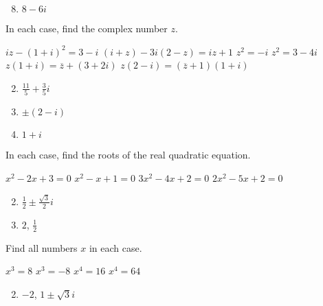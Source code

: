 \begin{multicols}{2}
\begin{ex}
\begin{sol}
\begin{enumerate}[label={\alph*.}]
\setcounter{enumi}{7}
\item  $8 - 6i$

\end{enumerate}
\end{sol}
\end{ex}

\begin{ex}
In each case, find the complex number $z$.

\begin{exenumerate}
\exitem $ iz - (1 + i)^{2} = 3 - i$
\exitem* $(i + z) - 3i(2 - z) = iz + 1$
\exitem $z^{2} = -i$
\exitem $z^{2} = 3 - 4i$
\exitem $z(1+i) = \overline{z} + (3+2i)$
\exitem* $z(2-i) = (\overline{z}+1)(1+i)$
\end{exenumerate}
\begin{sol}
\begin{enumerate}[label={\alph*.}]
\setcounter{enumi}{1}
\item $\frac{11}{5} + \frac{3}{5}i$


\setcounter{enumi}{3}
\item  $\pm(2 - i)$

\setcounter{enumi}{5}
\item $ 1 + i$

\end{enumerate}
\end{sol}
\end{ex}

\begin{ex}
In each case, find the roots of the real quadratic equation.

\begin{exenumerate}
\exitem  $x^{2} - 2x + 3 = 0$
\exitem  $x^{2} - x + 1 = 0$
\exitem $3x^{2} - 4x + 2 = 0$
\exitem  $2x^{2} - 5x + 2 = 0$
\end{exenumerate}
\begin{sol}
\begin{enumerate}[label={\alph*.}]
\setcounter{enumi}{1}
\item $\frac{1}{2} \pm \frac{\sqrt{3}}{2}i$


\setcounter{enumi}{3}
\item  $2$, $\frac{1}{2}$

\end{enumerate}
\end{sol}
\end{ex}

\begin{ex}
Find all numbers $x$ in each case.

\begin{exenumerate}
\exitem $x^{3} = 8$
\exitem $x^{3} = -8$
\exitem  $x^{4} = 16$
\exitem  $x^{4} = 64$
\end{exenumerate}
\begin{sol}
\begin{enumerate}[label={\alph*.}]
\setcounter{enumi}{1}
\item  $-2$, $1 \pm \sqrt{3}i$



\end{enumerate}
\end{sol}
\end{ex}
\end{multicols}
